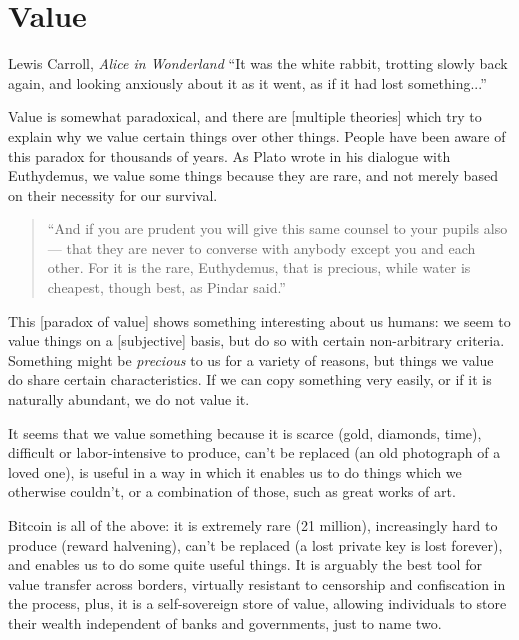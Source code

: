 \chapter{ Value}
\label{les:10}

\begin{chapquote}{Lewis Carroll, \textit{Alice in Wonderland}}
``It was the white rabbit, trotting slowly back again, and looking anxiously
about it as it went, as if it had lost something...''
\end{chapquote}

Value is somewhat paradoxical, and there are [multiple theories] which
try to explain why we value certain things over other things. People
have been aware of this paradox for thousands of years. As Plato wrote
in his dialogue with Euthydemus, we value some things because they are
rare, and not merely based on their necessity for our survival.

\begin{quotation}
``And if you are prudent you will give this same counsel to your pupils
also --- that they are never to converse with anybody except you and
each other. For it is the rare, Euthydemus, that is precious, while
water is cheapest, though best, as Pindar said.''
\end{quotation}

This [paradox of value] shows something interesting about us humans: we
seem to value things on a [subjective] basis, but do so with certain
non-arbitrary criteria. Something might be \textit{precious} to us for a
variety of reasons, but things we value do share certain
characteristics. If we can copy something very easily, or if it is
naturally abundant, we do not value it.

It seems that we value something because it is scarce (gold, diamonds,
time), difficult or labor-intensive to produce, can't be replaced (an
old photograph of a loved one), is useful in a way in which it enables
us to do things which we otherwise couldn't, or a combination of those,
such as great works of art.

Bitcoin is all of the above: it is extremely rare (21 million),
increasingly hard to produce (reward halvening), can't be replaced (a
lost private key is lost forever), and enables us to do some quite
useful things. It is arguably the best tool for value transfer across
borders, virtually resistant to censorship and confiscation in the
process, plus, it is a self-sovereign store of value, allowing
individuals to store their wealth independent of banks and governments,
just to name two.

